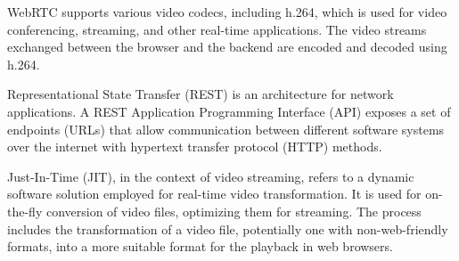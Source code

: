 \documentclass[../MasterThesis.tex]{subfiles}
\begin{document}
WebRTC supports various video codecs, including h.264, which is used for video conferencing, streaming, and other real-time applications. The video streams exchanged between the browser and the backend are encoded and decoded using h.264.~\cite{h264}













Representational State Transfer (REST) is an architecture for network applications. A REST Application Programming Interface (API) exposes a set of endpoints (URLs) that allow communication between different software systems over the internet with hypertext transfer protocol (HTTP) methods.~\cite{IEEE_Rest, webservice, Nodejs_Rest}



	
Just-In-Time (JIT), in the context of video streaming, refers to a dynamic software solution employed for real-time video transformation. It is used for on-the-fly conversion of video files, optimizing them for streaming. The process includes the transformation of a video file, potentially one with non-web-friendly formats, into a more suitable format for the playback in web browsers.~\cite{JIT_IEEE}
\end{document}
